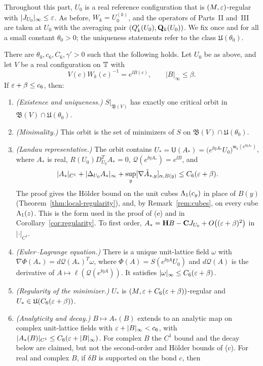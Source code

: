 Throughout this part, $U_0$ is a real reference configuration that is $(M,\varepsilon)$-regular with $|J_{U_0}|_\infty\le\varepsilon$. As before, $W_k=U_0^{(k)}$, and the operators of Parts~II and~III are taken at $U_0$ with the averaging pair $(Q'_k(U_0),\mathbf Q_k(U_0))$. We fix once and for all a small constant $\theta_0>0$; the uniqueness statements refer to the class $\mathfrak U(\theta_0)$.

\begin{theorem}\label{thm:variational}
There are $\theta_0,c_6,C_6,\gamma'>0$ such that the following holds. Let $U_0$ be as above, and let $V$ be a real configuration on $\mathbb T$ with
\[
V(c)W_k(c)^{-1}=e^{\ii B(c)},\qquad|B|_\infty\le\beta .
\]
If $\varepsilon+\beta\le c_6$, then:
\begin{enumerate}[label=(\alph*)]
\item \emph{(Existence and uniqueness.)} $S|_{\mathfrak B(V)}$ has exactly one critical orbit in $\mathfrak B(V)\cap\mathfrak U(\theta_0)$.
\item \emph{(Minimality.)} This orbit is the set of minimizers of $S$ on $\mathfrak B(V)\cap\mathfrak U(\theta_0)$.
\item \emph{(Landau representative.)} The orbit contains $U_*=\mathsf U(A_*)=\big(e^{\ii\eta A_*}U_0\big)^{\mathsf w_k(e^{\ii\eta A_*})}$, where $A_*$ is real, $R(U_0)D^T_{U_0}A_*=0$, $\mathcal Q(e^{\ii\eta A_*})=e^{\ii B}$, and
\[
|A_*|_{C^1}+|\Delta_{U_0}A_*|_\infty+\sup_y[\nabla\tilde A_{*,y}]_{\alpha,B(y)}\le C_6(\varepsilon+\beta).
\]
The proof gives the H\"older bound on the unit cubes $\Lambda_1(c_y)$ in place of $B(y)$ (Theorem~\ref{thm:local-regularity}), and, by Remark~\ref{rem:cubes}, on every cube $\Lambda_1(z)$. This is the form used in the proof of (e) and in Corollary~\ref{cor:regularity}.
To first order, $A_*=\mathbf H B-\mathbf C J_{U_0}+O\big((\varepsilon+\beta)^2\big)$ in $|\cdot|_{C^1}$.
\item \emph{(Euler--Lagrange equation.)} There is a unique unit-lattice field $\omega$ with $\nabla\Phi(A_*)=d\mathcal Q(A_*)^T\omega$, where $\Phi(A)=S(e^{\ii\eta A}U_0)$ and $d\mathcal Q(A)$ is the derivative of $A\mapsto\ell(\mathcal Q(e^{\ii\eta A}))$. It satisfies $|\omega|_\infty\le C_6(\varepsilon+\beta)$.
\item \emph{(Regularity of the minimizer.)} $U_*$ is $(M,\varepsilon+C_6(\varepsilon+\beta))$-regular and $U_*\in\mathfrak U(C_6(\varepsilon+\beta))$.
\item \emph{(Analyticity and decay.)} $B\mapsto A_*(B)$ extends to an analytic map on complex unit-lattice fields with $\varepsilon+|B|_\infty<c_6$, with $|A_*(B)|_{C^1}\le C_6(\varepsilon+|B|_\infty)$. For complex $B$ the $C^1$ bound and the decay below are claimed, but not the second-order and H\"older bounds of (c). For real and complex $B$, if $\delta B$ is supported on the bond $c$, then

\end{enumerate}
\end{theorem}
